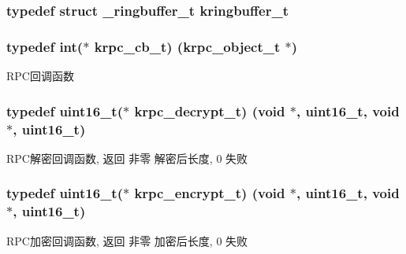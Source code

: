 \subsubsection[{kringbuffer\+\_\+t}]{\setlength{\rightskip}{0pt plus 5cm}typedef struct {\bf \+\_\+ringbuffer\+\_\+t} {\bf kringbuffer\+\_\+t}}\label{a00054_a66d91f7667db1f0b2983fc25e1a20f1c_a66d91f7667db1f0b2983fc25e1a20f1c}
\hypertarget{a00054_a06bb708c1b97445d3a5d0c1b32ad2ab6_a06bb708c1b97445d3a5d0c1b32ad2ab6}{}
\subsubsection[{krpc\+\_\+cb\+\_\+t}]{\setlength{\rightskip}{0pt plus 5cm}typedef int($\ast$ krpc\+\_\+cb\+\_\+t) ({\bf krpc\+\_\+object\+\_\+t} $\ast$)}\label{a00054_a06bb708c1b97445d3a5d0c1b32ad2ab6_a06bb708c1b97445d3a5d0c1b32ad2ab6}
R\+P\+C回调函数 \hypertarget{a00054_a5cf750f151c90f0589f68fe8c4421f1d_a5cf750f151c90f0589f68fe8c4421f1d}{}
\subsubsection[{krpc\+\_\+decrypt\+\_\+t}]{\setlength{\rightskip}{0pt plus 5cm}typedef uint16\+\_\+t($\ast$ krpc\+\_\+decrypt\+\_\+t) (void $\ast$, uint16\+\_\+t, void $\ast$, uint16\+\_\+t)}\label{a00054_a5cf750f151c90f0589f68fe8c4421f1d_a5cf750f151c90f0589f68fe8c4421f1d}
R\+P\+C解密回调函数, 返回 非零 解密后长度, 0 失败 \hypertarget{a00054_ae41a67cc07f8dff897ca978e03b1f2d7_ae41a67cc07f8dff897ca978e03b1f2d7}{}
\subsubsection[{krpc\+\_\+encrypt\+\_\+t}]{\setlength{\rightskip}{0pt plus 5cm}typedef uint16\+\_\+t($\ast$ krpc\+\_\+encrypt\+\_\+t) (void $\ast$, uint16\+\_\+t, void $\ast$, uint16\+\_\+t)}\label{a00054_ae41a67cc07f8dff897ca978e03b1f2d7_ae41a67cc07f8dff897ca978e03b1f2d7}
R\+P\+C加密回调函数, 返回 非零 加密后长度, 0 失败 \hypertarget{a00054_acc87d36519075f20746c9708a94d12d0_acc87d36519075f20746c9708a94d12d0}{}
